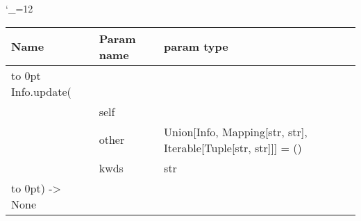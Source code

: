 \begingroup \catcode`\_=12 \tt
\begin{tabular}{lll}
\toprule
\textrm{Name}&\textrm{Param name}&\textrm{param type}\\
\midrule
\hbox to 0pt {Info.update(\hss}\\
& self\\
& other & Union[Info, Mapping[str, str], Iterable[Tuple[str, str]]] = ()\\
& kwds & str\\
\hbox to 0pt{) -> None\hss}\\
\bottomrule
\end{tabular}
\endgroup
